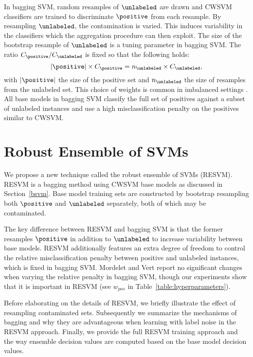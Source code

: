 In bagging SVM, random resamples of $\unlabeled$ are drawn and CWSVM classifiers are trained to discriminate $\positive$ from each resample. By resampling $\unlabeled$, the contamination is varied. This induces variability in the classifiers which the aggregation procedure can then exploit. The size of the bootstrap resample of $\unlabeled$ is a tuning parameter in bagging SVM. The ratio $C_{\positive}/C_{\unlabeled}$ is fixed so that the following holds:
\begin{equation}
|\positive| \times C_{\positive} = n_{\unlabeled} \times C_{\unlabeled}, \label{eq:bagpenalties}
\end{equation}
with $|\positive|$ the size of the positive set and $n_{\unlabeled}$ the size of resamples from the unlabeled set. This choice of weights is common in imbalanced settings \citep{cawley2006leave,daemen2009kernel}. All base models in bagging SVM classify the full set of positives against a subset of unlabeled instances and use a high misclassification penalty on the positives similar to CWSVM. %




\section{Robust Ensemble of SVMs}

We propose a new technique called the robust ensemble of SVMs (RESVM). RESVM is a bagging method using CWSVM base models as discussed in Section~\ref{bsvm}. Base model training sets are constructed by bootstrap resampling both $\positive$ and $\unlabeled$ separately, both of which may be contaminated. 

The key difference between RESVM and bagging SVM is that the former resamples $\positive$ in addition to $\unlabeled$ to increase variability between base models. RESVM additionally features an extra degree of freedom to control the relative misclassification penalty between positive and unlabeled instances, which is fixed in bagging SVM. Mordelet and Vert \citep{mordelet2014bagging} report no significant changes when varying the relative penalty in bagging SVM, though our experiments show that it is important in RESVM (see $w_{pos}$ in Table~\ref{table:hyperparameters}).

Before elaborating on the details of RESVM, we briefly illustrate the effect of resampling contaminated sets. Subsequently we summarize the mechanisms of bagging and why they are advantageous when learning with label noise in the RESVM approach. Finally, we provide the full RESVM training approach and the way ensemble decision values are computed based on the base model decision values.


